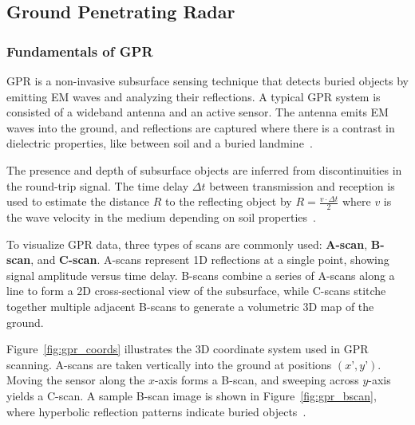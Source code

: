 \subsection{Ground Penetrating Radar}\label{GPR_system}

\subsubsection{Fundamentals of \gls{GPR}}\label{GPR_fundamental}

\gls{GPR} is a non-invasive subsurface sensing technique that detects buried objects by emitting \gls{EM} waves and analyzing their reflections. A typical \gls{GPR} system is consisted of a wideband antenna and an active sensor. The antenna emits \gls{EM} waves into the ground, and reflections are captured where there is a contrast in dielectric properties, like between soil and a buried landmine~\cite{paik2002image}.

The presence and depth of subsurface objects are inferred from discontinuities in the round-trip signal. The time delay $\Delta t$ between transmission and reception is used to estimate the distance $R$ to the reflecting object by \( R = \frac{v \cdot \Delta t}{2}\) where $v$ is the wave velocity in the medium depending on soil properties~\cite{paik2002image}.

To visualize \gls{GPR} data, three types of scans are commonly used: \textbf{A-scan}, \textbf{B-scan}, and \textbf{C-scan}. A-scans represent 1D reflections at a single point, showing signal amplitude versus time delay. B-scans combine a series of A-scans along a line to form a 2D cross-sectional view of the subsurface, while C-scans stitche together multiple adjacent B-scans to generate a volumetric 3D map of the ground. 

Figure~\ref{fig:gpr_coords} illustrates the 3D coordinate system used in \gls{GPR} scanning. A-scans are taken vertically into the ground at positions $(x’, y’)$. Moving the sensor along the $x$-axis forms a B-scan, and sweeping across $y$-axis yields a C-scan. A sample B-scan image is shown in Figure~\ref{fig:gpr_bscan}, where hyperbolic reflection patterns indicate buried objects~\cite{paik2002image}.

